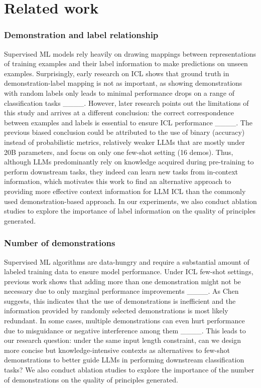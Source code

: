 \section{Related work}
\subsubsection{Demonstration and label relationship}  
Supervised ML models rely heavily on drawing mappings between representations of training examples and their label information to make predictions on unseen examples. Surprisingly, early research on ICL shows that ground truth in demonstration-label mapping is not as important, as showing demonstrations with random labels only leads to minimal performance drops on a range of classification tasks ____. However, later research points out the limitations of this study and arrives at a different conclusion: the correct correspondence between examples and labels is essential to ensure ICL performance ____. The previous biased conclusion could be attributed to the use of binary (accuracy) instead of probabilistic metrics, relatively weaker LLMs that are mostly under 20B parameters, and focus on only one few-shot setting (16 demos). Thus, although LLMs predominantly rely on knowledge acquired during pre-training to perform downstream tasks, they indeed can learn new tasks from in-context information, which motivates this work to find an alternative approach to providing more effective context information for LLM ICL than the commonly used demonstration-based approach. In our experiments, we also conduct ablation studies to explore the importance of label information on the quality of principles generated.
\subsubsection{Number of demonstrations}
Supervised ML algorithms are data-hungry and require a substantial amount of labeled training data to ensure model performance. Under ICL few-shot settings, previous work shows that adding more than one demonstration might not be necessary due to only marginal performance improvements ____. As Chen suggests, this indicates that the use of demonstrations is inefficient and the information provided by randomly selected demonstrations is most likely redundant. In some cases, multiple demonstrations can even hurt performance due to misguidance or negative interference among them ____. This leads to our research question: under the same input length constraint, can we design more concise but knowledge-intensive contexts as alternatives to few-shot demonstrations to better guide LLMs in performing downstream classification tasks? We also conduct ablation studies to explore the importance of the number of demonstrations on the quality of principles generated.

